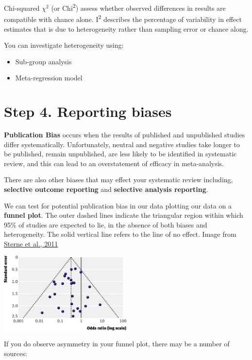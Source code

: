 \documentclass[
]{book}
\begin{document}
Chi-squared \(\chi^2\) (or Chi\textsuperscript{2}) assess whether observed differences in results are compatible with chance alone.
I\textsuperscript{2} describes the percentage of variability in effect estimates that is due to heterogeneity rather than sampling error or chance along.

You can investigate heterogeneity using:

\begin{itemize}
\item
  Sub-group analysis
\item
  Meta-regression model
\end{itemize}

\hypertarget{step-4.-reporting-biases}{%
\section{Step 4. Reporting biases}\label{step-4.-reporting-biases}}

\textbf{Publication Bias} occurs when the results of published and unpublished studies differ systematically. Unfortunately, neutral and negative studies take longer to be published, remain unpublished, are less likely to be identified in systematic review, and this can lead to an overstatement of efficacy in meta-analysis.

There are also other biases that may effect your systematic review including, \textbf{selective outcome reporting} and \textbf{selective analysis reporting}.

We can test for potential publication bias in our data plotting our data on a \textbf{funnel plot}.
The outer dashed lines indicate the triangular region within which 95\% of studies are expected to lie, in the absence of both biases and heterogeneity. The solid vertical line refers to the line of no effect. Image from \href{https://www.bmj.com/content/343/bmj.d4002}{Sterne et al., 2011}

\includegraphics[width=0.5\textwidth,height=\textheight]{figs/funnelplot.jpg}

If you do observe asymmetry in your funnel plot, there may be a number of sources:
\end{document}
